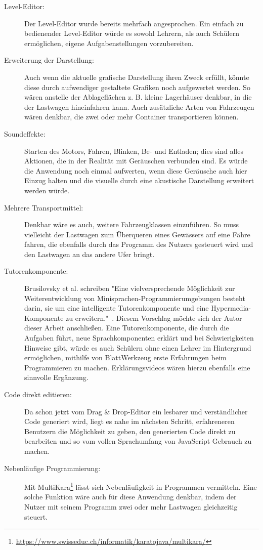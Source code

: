\begin{description}
  \item[Level-Editor:] Der Level-Editor wurde bereits mehrfach angesprochen. Ein einfach zu bedienender Level-Editor würde es sowohl Lehrern, als auch Schülern ermöglichen, eigene Aufgabenstellungen vorzubereiten.
  \item[Erweiterung der Darstellung:] Auch wenn die aktuelle grafische Darstellung ihren Zweck erfüllt, könnte diese durch aufwendiger gestaltete Grafiken noch aufgewertet werden. So wären anstelle der Ablageflächen z. B. kleine Lagerhäuser denkbar, in die der Lastwagen hineinfahren kann. Auch zusätzliche Arten von Fahrzeugen wären denkbar, die zwei oder mehr Container transportieren können.
  \item[Soundeffekte:] Starten des Motors, Fahren, Blinken, Be- und Entladen; dies sind alles Aktionen, die in der Realität mit Geräuschen verbunden sind. Es würde die Anwendung noch einmal aufwerten, wenn diese Geräusche auch hier Einzug halten und die visuelle durch eine akustische Darstellung erweitert werden würde.
  \item[Mehrere Transportmittel:] Denkbar wäre es auch, weitere Fahrzeugklassen einzuführen. So muss vielleicht der Lastwagen zum Überqueren eines Gewässers auf eine Fähre fahren, die ebenfalls durch das Programm des Nutzers gesteuert wird und den Lastwagen an das andere Ufer bringt.
  \item[Tutorenkomponente:] Brusilovsky et al. schreiben "Eine vielversprechende Möglichkeit zur Weiterentwicklung von Minisprachen-Programmierumgebungen besteht darin, sie um eine intelligente Tutorenkomponente und eine Hypermedia-Komponente zu erweitern."~\cite[80]{brusilovsky1997}. Diesem Vorschlag möchte sich der Autor dieser Arbeit anschließen. Eine Tutorenkomponente, die durch die Aufgaben führt, neue Sprachkomponenten erklärt und bei Schwierigkeiten Hinweise gibt, würde es auch Schülern ohne einen Lehrer im Hintergrund ermöglichen, mithilfe von BlattWerkzeug erste Erfahrungen beim Programmieren zu machen. Erklärungsvideos wären hierzu ebenfalls eine sinnvolle Ergänzung.
  \item[Code direkt editieren:] Da schon jetzt vom Drag \& Drop-Editor ein lesbarer und verständlicher Code generiert wird, liegt es nahe im nächsten Schritt, erfahreneren Benutzern die Möglichkeit zu geben, den generierten Code direkt zu bearbeiten und so vom vollen Sprachumfang von JavaScript Gebrauch zu machen.
  \item[Nebenläufige Programmierung:] Mit MultiKara\footnote{\url{https://www.swisseduc.ch/informatik/karatojava/multikara/}} lässt sich Nebenläufigkeit in Programmen vermitteln. Eine solche Funktion wäre auch für diese Anwendung denkbar, indem der Nutzer mit seinem Programm zwei oder mehr Lastwagen gleichzeitig steuert.
\end{description}
